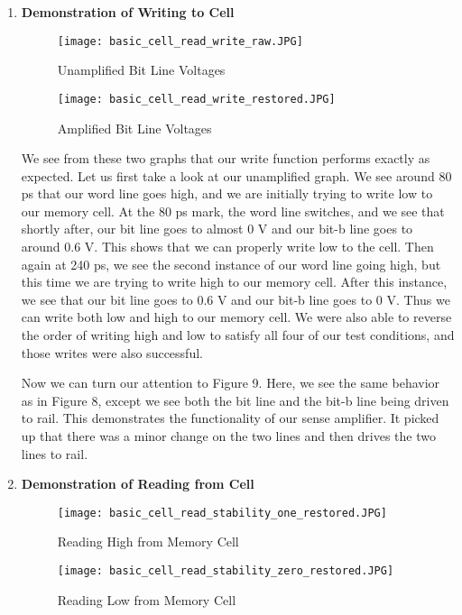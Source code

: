 \documentclass[11pt]{article}
\theoremstyle{definition}
\begin{document}
\begin{enumerate}
\begin{enumerate}

\item \textbf{Demonstration of Writing to Cell} \\
\begin{figure} [H]
	\caption{Unamplified Bit Line Voltages}
    \centering
    	\texttt{[image: basic\_cell\_read\_write\_raw.JPG]}
\end{figure}

\begin{figure} [H]
	\caption{Amplified Bit Line Voltages}
    \centering
    	\texttt{[image: basic\_cell\_read\_write\_restored.JPG]}
\end{figure}

We see from these two graphs that our write function performs exactly as expected. Let us first take a look at our unamplified graph. We see around 80 ps that our word line goes high, and we are initially trying to write low to our memory cell. At the 80 ps mark, the word line switches, and we see that shortly after, our bit line goes to almost 0 V and our bit-b line goes to around 0.6 V. This shows that we can properly write low to the cell. Then again at 240 ps, we see the second instance of our word line going high, but this time we are trying to write high to our memory cell. After this instance, we see that our bit line goes to 0.6 V and our bit-b line goes to 0 V. Thus we can write both low and high to our memory cell. We were also able to reverse the order of writing high and low to satisfy all four of our test conditions, and those writes were also successful.

Now we can turn our attention to Figure 9. Here, we see the same behavior as in Figure 8, except we see both the bit line and the bit-b line being driven to rail. This demonstrates the functionality of our sense amplifier. It picked up that there was a minor change on the two lines and then drives the two lines to rail.

\item \textbf{Demonstration of Reading from Cell} \\
\begin{figure} [H]
	\caption{Reading High from Memory Cell}
    \centering
    	\texttt{[image: basic\_cell\_read\_stability\_one\_restored.JPG]}
\end{figure}

\begin{figure} [H]
	\caption{Reading Low from Memory Cell}
    \centering
    	\texttt{[image: basic\_cell\_read\_stability\_zero\_restored.JPG]}
\end{figure}


\end{enumerate}
\end{enumerate}
\end{document}
